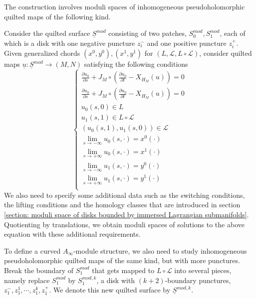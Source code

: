 \documentclass{amsart}
\numberwithin{equation}{section}
\numberwithin{figure}{section}
\begin{document}
	The construction involves moduli spaces of inhomogeneous pseudoholomorphic quilted maps of the following kind. \par
	Consider the quilted surface $\underline{S}^{mod}$ consisting of two patches, $S_{0}^{mod}, S_{1}^{mod}$, each of which is a disk with one negative puncture $z_{i}^{-}$ and one positive puncture $z_{i}^{+}$. Given generalized chords $(x^{0}, y^{0}), (x^{1}, y^{1})$ for $(L, \mathcal{L}, L \circ \mathcal{L})$, consider quilted maps $\underline{u}: \underline{S}^{mod} \to (M, N)$ satisfying the following conditions
\begin{equation}
\begin{cases}
\frac{\partial u_{0}}{\partial s} + J_{M} \circ (\frac{\partial u_{0}}{\partial t} - X_{H_{M}}(u)) = 0\\
\frac{\partial u_{0}}{\partial s} + J_{M} \circ (\frac{\partial u_{0}}{\partial t} - X_{H_{M}}(u)) = 0\\
u_{0}(s, 0) \in L\\
u_{1}(s, 1) \in L \circ \mathcal{L}\\
(u_{0}(s, 1), u_{1}(s, 0)) \in \mathcal{L}\\
\lim_{s \to -\infty}u_{0}(s, \cdot) = x^{0}(\cdot)\\
\lim_{s \to +\infty}u_{0}(s, \cdot) = x^{1}(\cdot)\\
\lim_{s \to -\infty}u_{1}(s, \cdot) = y^{0}(\cdot)\\
\lim_{s \to +\infty}u_{1}(s, \cdot) = y^{1}(\cdot)\\
\end{cases}
\end{equation}
We also need to specify some additional data such as the switching conditions, the lifting conditions and the homology classes that are introduced in section \ref{section: moduli space of disks bounded by immersed Lagrangian submanifolds}. Quotienting by translations, we obtain moduli spaces of solutions to the above equation with these additional requirements. \par
	To define a curved $A_{\infty}$-module structure, we also need to study inhomogeneous pseudoholomorphic quilted maps of the same kind, but with more punctures. Break the boundary of $S_{1}^{mod}$ that gets mapped to $L \circ \mathcal{L}$ into several pieces, namely replace $S_{1}^{mod}$ by $S_{1}^{mod, k}$, a disk with $(k+2)$-boundary punctures, $z_{1}^{-}, z_{1}^{1}, \cdots, z_{1}^{k}, z_{1}^{+}$. We denote this new quilted surface by $\underline{S}^{mod, k}$. \par
\end{document}
